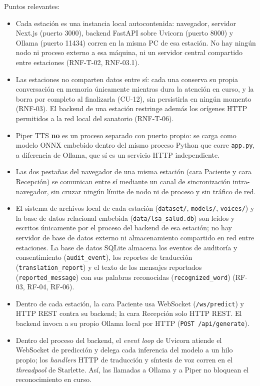 Puntos relevantes:
\begin{itemize}
    \item Cada estación es una instancia local autocontenida: navegador,
    servidor Next.js (puerto 3000), backend FastAPI sobre Uvicorn (puerto
    8000) y Ollama (puerto 11434) corren en la misma PC de esa estación. No
    hay ningún nodo ni proceso externo a esa máquina, ni un servidor
    central compartido entre estaciones (RNF-T-02, RNF-03.1).
    \item Las estaciones no comparten datos entre sí: cada una conserva su
    propia conversación en memoria únicamente mientras dura la atención en
    curso, y la borra por completo al finalizarla (CU-12), sin persistirla
    en ningún momento (RNF-03). El backend de una estación restringe además
    los orígenes HTTP permitidos a la red local del sanatorio (RNF-T-06).
    \item Piper TTS \textbf{no} es un proceso separado con puerto propio: se
    carga como modelo ONNX embebido dentro del mismo proceso Python que
    corre \texttt{app.py}, a diferencia de Ollama, que sí es un servicio
    HTTP independiente.
    \item Las dos pestañas del navegador de una misma estación (cara
    Paciente y cara Recepción) se comunican entre sí mediante un canal de
    sincronización intra-navegador, sin cruzar ningún límite de nodo ni de
    proceso y sin tráfico de red.
    \item El sistema de archivos local de cada estación (\texttt{dataset/},
    \texttt{models/}, \texttt{voices/}) y la base de datos relacional embebida
    (\texttt{data/lsa\_salud.db}) son leídos y escritos únicamente por el
    proceso del backend de esa estación; no hay servidor de base de datos
    externo ni almacenamiento compartido en red entre estaciones. La base de
    datos SQLite almacena los eventos de auditoría y consentimiento
    (\texttt{audit\_event}), los reportes de traducción
    (\texttt{translation\_report}) y el texto de los mensajes reportados
    (\texttt{reported\_message}) con sus palabras reconocidas
    (\texttt{recognized\_word}) (RF-03, RF-04, RF-06).
    \item Dentro de cada estación, la cara Paciente usa WebSocket
    (\texttt{/ws/predict}) y HTTP REST contra su backend; la cara Recepción
    solo HTTP REST. El backend invoca a su propio Ollama local por HTTP
    (\texttt{POST /api/generate}).
    \item Dentro del proceso del backend, el \textit{event loop} de Uvicorn
    atiende el WebSocket de predicción y delega cada inferencia del modelo a
    un hilo propio; los \textit{handlers} HTTP de traducción y síntesis de
    voz corren en el \textit{threadpool} de Starlette. Así, las llamadas a
    Ollama y a Piper no bloquean el reconocimiento en curso.
\end{itemize}

